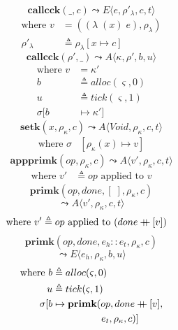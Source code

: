 \documentclass[12pt,draft]{article}
\newcommand\mdoubleplus{\ensuremath{\mathbin{+\mkern-9mu+}}}
\newcommand{\singlelamsyn}[2]{(\lambda\;(#1)\;#2)}
\begin{document}
\begin{multicols*}{2}
\[
\textbf{callcck}(\_, c)
\leadsto
E\langle
e , \rho'_{\lambda} , c , t
\rangle
\]
\vspace{-13mm}
\begin{align*}
\text{where } v &= (\singlelamsyn{x}{e} , \rho_{\lambda}) \\
\rho'_{\lambda} &\triangleq \rho_{\lambda}[x \mapsto c]
\end{align*}
\[
\textbf{callcck}(\rho' , \_)
\leadsto
A\langle
\kappa , \rho' , b , u
\rangle
\]
\vspace{-10mm}
\begin{align*}
\text{where } v &= \kappa' \\
b &\triangleq alloc(\varsigma, 0) \\
u &\triangleq tick(\varsigma, 1) \\
\sigma[b &\mapsto \kappa']
\end{align*}
\[
\textbf{setk}(x, \rho_{\kappa}, c)
\leadsto
A\langle
\textit{Void} , \rho_{\kappa} , c , t
\rangle
\]
\vspace{-10mm}
\begin{align*}
\text{where } \sigma&[\rho_{\kappa}(x) \mapsto v]
\end{align*}
\[
\textbf{appprimk}(op, \rho_{\kappa}, c)
\leadsto
A\langle
v' , \rho_{\kappa} , c , t
\rangle
\]
\vspace{-12mm}
\begin{align*}
\text{where } v' &\triangleq op \text{ applied to } v
\end{align*}
\[
\textbf{primk}(op, done, [\;], \rho_{\kappa}, c)
\]
\vspace{-7mm}
\[
\leadsto
A\langle
v' , \rho_{\kappa} , c , t
\rangle
\]
\vspace{-12mm}
\begin{align*}
\text{where } v' &\triangleq op \text{ applied to } (done \mdoubleplus [v])
\end{align*}
\[
\textbf{primk}(op, done, e_h::e_t,\rho_{\kappa}, c)
\]
\vspace{-7mm}
\[
\leadsto
E\langle
e_h , \rho_{\kappa} , b , u
\rangle
\]
\vspace{-11mm}
\begin{align*}
\text{where } b &\triangleq alloc(\varsigma, 0) \\
u &\triangleq tick(\varsigma, 1) \\
\sigma[b &\mapsto \textbf{primk}(op, done \mdoubleplus [v], \\
&\;\;\;\;\;\;\;\;\;\;\;\;\;\;\;\;\;\; e_t, \rho_{\kappa}, c)]
\end{align*}
\end{multicols*}
\newpage
\end{document}
